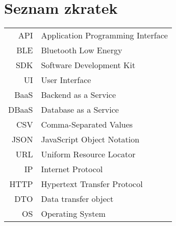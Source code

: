 \documentclass[czech,master,unicode,draft]{ctufit-thesis}
\theoremstyle{plain}
\theoremstyle{definition}
\theoremstyle{remark}
\numberwithin{theorem}{chapter}
\begin{document}
\printabstractpage %

% 
% 
% 
% 
% 
% 
% 
% 
% 

\chapter{Seznam zkratek}
	
\begin{tabular}{rl}
API & Application Programming Interface\\
BLE & Bluetooth Low Energy\\
SDK & Software Development Kit\\
UI & User Interface\\
BaaS & Backend as a Service\\
DBaaS & Database as a Service\\
CSV & Comma-Separated Values\\
JSON & JavaScript Object Notation\\
URL & Uniform Resource Locator\\
IP & Internet Protocol\\
HTTP & Hypertext Transfer Protocol\\
DTO & Data transfer object\\
OS & Operating System\\
\end{tabular}
\end{document}
